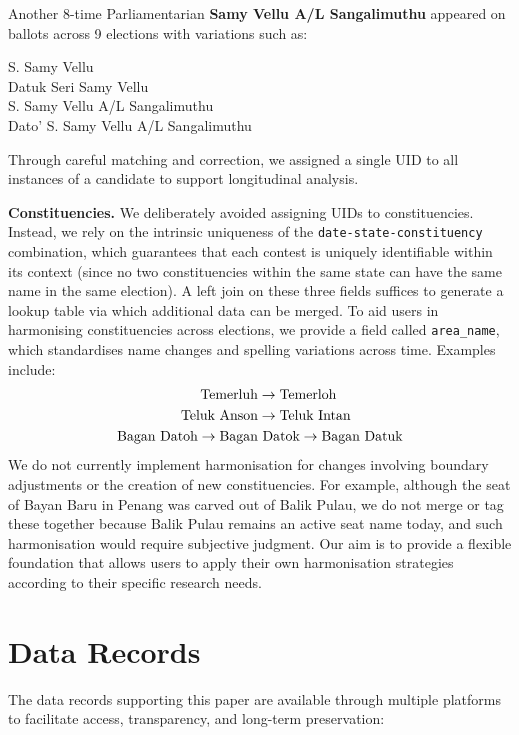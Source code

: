 \documentclass[11pt]{article}
\begin{document}
Another 8-time Parliamentarian \textbf{Samy Vellu A/L Sangalimuthu} appeared on ballots across 9 elections with variations such as:

\begin{centering}

S. Samy Vellu\\
Datuk Seri Samy Vellu\\
S. Samy Vellu A/L Sangalimuthu\\
Dato' S. Samy Vellu A/L Sangalimuthu

\end{centering}
Through careful matching and correction, we assigned a single UID to all instances of a candidate to support longitudinal analysis.

\textbf{Constituencies.}
We deliberately avoided assigning UIDs to constituencies. Instead, we rely on the intrinsic uniqueness of the \texttt{date-state-constituency} combination, which guarantees that each contest is uniquely identifiable within its context (since no two constituencies within the same state can have the same name in the same election). A left join on these three fields suffices to generate a lookup table via which additional data can be merged. To aid users in harmonising constituencies across elections, we provide a field called \texttt{area\_name}, which standardises name changes and spelling variations across time. Examples include:
\begin{align*}
\text{Temerluh} &\rightarrow \space \text{Temerloh}\\ 
\text{Teluk Anson} &\rightarrow \space \text{Teluk Intan}\\
\text{Bagan Datoh} \rightarrow \space \text{Bagan}&\text{ }\text{Datok} \rightarrow \space \text{Bagan Datuk}
\end{align*}
We do not currently implement harmonisation for changes involving boundary adjustments or the creation of new constituencies. For example, although the seat of Bayan Baru in Penang was carved out of Balik Pulau, we do not merge or tag these together because Balik Pulau remains an active seat name today, and such harmonisation would require subjective judgment. Our aim is to provide a flexible foundation that allows users to apply their own harmonisation strategies according to their specific research needs.

\section*{Data Records}
The data records supporting this paper are available through multiple platforms to facilitate access, transparency, and long-term preservation:
\end{document}
